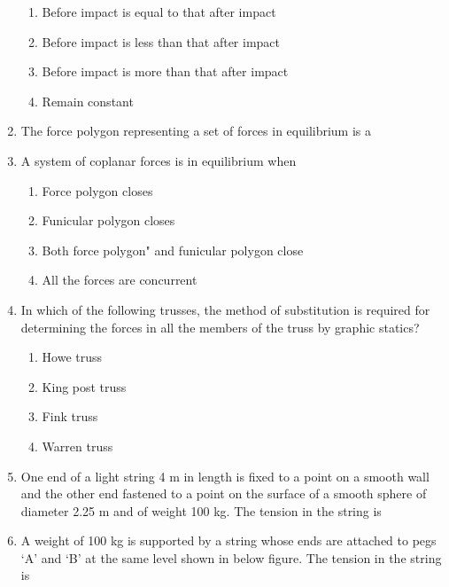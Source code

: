 \documentclass[11pt,a4paper]{article}
\begin{document}
\begin{enumerate}
\begin{enumerate}[label=\Alph*.]
\item{Before impact is equal to that after impact}
\item{Before impact is less than that after impact}
\item{Before impact is more than that after impact}
\item{Remain constant}
\end{enumerate}
\item{The force polygon representing a set of forces in equilibrium is a}
\\
\item{A system of coplanar forces is in equilibrium when}
\begin{enumerate}[label=\Alph*.]
\item{Force polygon closes}
\item{Funicular polygon closes}
\item{Both force polygon" and funicular polygon close}
\item{All the forces are concurrent}
\end{enumerate}
\item{In which of the following trusses, the method of substitution is required for determining the forces in all the members of the truss by graphic statics?}
\begin{enumerate}[label=\Alph*.]
\item{Howe truss}
\item{King post truss}
\item{Fink truss}
\item{Warren truss}
\end{enumerate}
\item{One end of a light string 4 m in length is fixed to a point on a smooth wall and the other end fastened to a point on the surface of a smooth sphere of diameter 2.25 m and of weight 100 kg. The tension in the string is}
\\
\item{A weight of 100 kg is supported by a string whose ends are attached to pegs `A' and `B' at the same level shown in below figure. The tension in the string is \\

}
\end{enumerate}
\end{document}
